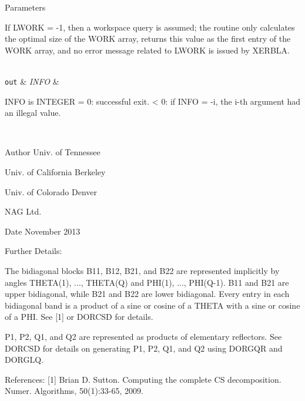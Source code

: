 \begin{DoxyParams}[1]{Parameters}
\begin{DoxyVerb}
          If LWORK = -1, then a workspace query is assumed; the routine
          only calculates the optimal size of the WORK array, returns
          this value as the first entry of the WORK array, and no error
          message related to LWORK is issued by XERBLA.\end{DoxyVerb}
\\
\hline
\mbox{\tt out}  & {\em I\+N\+F\+O} & \begin{DoxyVerb}          INFO is INTEGER
          = 0:  successful exit.
          < 0:  if INFO = -i, the i-th argument had an illegal value.\end{DoxyVerb}
 \\
\hline
\end{DoxyParams}
\begin{DoxyAuthor}{Author}
Univ. of Tennessee 

Univ. of California Berkeley 

Univ. of Colorado Denver 

N\+A\+G Ltd. 
\end{DoxyAuthor}
\begin{DoxyDate}{Date}
November 2013 
\end{DoxyDate}
\begin{DoxyParagraph}{Further Details\+: }
\begin{DoxyVerb}  The bidiagonal blocks B11, B12, B21, and B22 are represented
  implicitly by angles THETA(1), ..., THETA(Q) and PHI(1), ...,
  PHI(Q-1). B11 and B21 are upper bidiagonal, while B21 and B22 are
  lower bidiagonal. Every entry in each bidiagonal band is a product
  of a sine or cosine of a THETA with a sine or cosine of a PHI. See
  [1] or DORCSD for details.

  P1, P2, Q1, and Q2 are represented as products of elementary
  reflectors. See DORCSD for details on generating P1, P2, Q1, and Q2
  using DORGQR and DORGLQ.\end{DoxyVerb}
 
\end{DoxyParagraph}
\begin{DoxyParagraph}{References\+: }
\mbox{[}1\mbox{]} Brian D. Sutton. Computing the complete C\+S decomposition. Numer. Algorithms, 50(1)\+:33-\/65, 2009. 
\end{DoxyParagraph}
